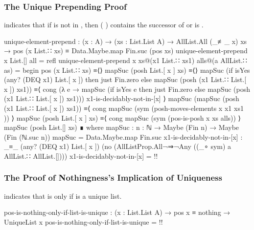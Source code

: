 \documentclass{report}
\begin{document}
\subsubsection{The Unique Prepending Proof}
 indicates that if  is not in , then  \AgdaSymbol(  \AgdaSymbol) contains the successor of   or is .

\begin{code}
    unique-element-prepend :
      (x : A) →
      (xs : List.List A) →
      AllList.All (_≢_ x) xs →
      pos (x List.∷ xs) ≡ Data.Maybe.map Fin.suc (pos xs)
    unique-element-prepend x List.[] all = refl
    unique-element-prepend x xs@(x1 List.∷ xs1) alls@(a AllList.∷ as) = begin
      pos (x List.∷ xs)
        ≡⟨⟩
      mapSuc (posh List.[ x ] xs)
        ≡⟨⟩
      mapSuc (if isYes (any? (DEQ x1) List.[ x ])
                 then just Fin.zero
                 else mapSuc (posh (x1 List.∷ List.[ x ]) xs1))
        ≡⟨ cong (λ e → mapSuc (if isYes e
                                   then just Fin.zero
                                   else mapSuc (posh (x1 List.∷ List.[ x ]) xs1)))
                x1-is-decidably-not-in-[x] ⟩
      mapSuc (mapSuc (posh (x1 List.∷ List.[ x ]) xs1))
        ≡⟨ cong mapSuc (sym (posh-moves-elements {x} {x1} {xs1} )) ⟩
      mapSuc (posh List.[ x ] xs)
        ≡⟨ cong mapSuc (sym (pos-is-posh {x} {xs} alls)) ⟩
      mapSuc (posh List.[] xs) ∎
      where
      mapSuc : {n : ℕ} → Maybe (Fin n) → Maybe (Fin (ℕ.suc n))
      mapSuc = Data.Maybe.map Fin.suc
      x1-is-decidably-not-in-[x] :
        _≡_ (any? (DEQ x1) List.[ x ])
            (no (AllListProp.All¬⇒¬Any ((_∘ sym) a AllList.∷ AllList.[])))
      x1-is-decidably-not-in-[x] = {!!}
\end{code}

\subsubsection{The Proof of Nothingness's Implication of Uniqueness}
 indicates that   is  only if  is a unique list.

\begin{code}
    pos-is-nothing-only-if-list-is-unique : (x : List.List A) → pos x ≡ nothing → UniqueList x
    pos-is-nothing-only-if-list-is-unique = {!!}
\end{code}
\end{document}
